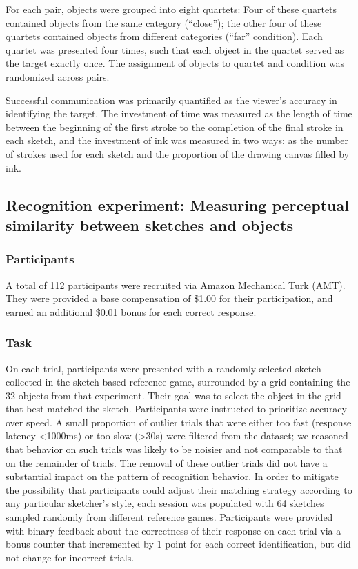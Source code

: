 \documentclass[9pt,twocolumn,twoside]{pnas-new}
\newcommand{\mwu}[1]{{\color{green}{[mwu: #1]}}}
\begin{document}
{For each pair, objects were grouped into eight quartets: Four of these quartets contained objects from the same category (``close''); the other four of these quartets contained objects from different categories (``far'' condition). \mwu{show picture of each condition?} Each quartet was presented four times, such that each object in the quartet served as the target exactly once. The assignment of objects to quartet and condition was randomized across pairs.

Successful communication was primarily quantified as the viewer's accuracy in identifying the target. The investment of time was measured as the length of time between the beginning of the first stroke to the completion of the final stroke in each sketch, and the investment of ink was measured in two ways: as the number of strokes used for each sketch and the proportion of the drawing canvas filled by ink.

\subsection*{Recognition experiment: Measuring perceptual similarity between sketches and objects}

\subsubsection*{Participants}

A total of 112 participants were recruited via Amazon Mechanical Turk (AMT). They were provided a base compensation of \$1.00 for their participation, and earned an additional \$0.01 bonus for each correct response.

\subsubsection*{Task}

On each trial, participants were presented with a randomly selected sketch collected in the sketch-based reference game, surrounded by a grid containing the 32 objects from that experiment. Their goal was to select the object in the grid that best matched the sketch. Participants were instructed to prioritize accuracy over speed. A small proportion of outlier trials that were either too fast (response latency <1000ms) or too slow (>30s) were filtered from the dataset; we reasoned that behavior on such trials was likely to be noisier and not comparable to that on the remainder of trials.\mwu{is this kosher?} The removal of these outlier trials did not have a substantial impact on the pattern of recognition behavior. In order to mitigate the possibility that participants could adjust their matching strategy according to any particular sketcher's style, each session was populated with 64 sketches sampled randomly from different reference games. Participants were provided with binary feedback about the correctness of their response on each trial via a bonus counter that incremented by 1 point for each correct identification, but did not change for incorrect trials.

}
\end{document}
